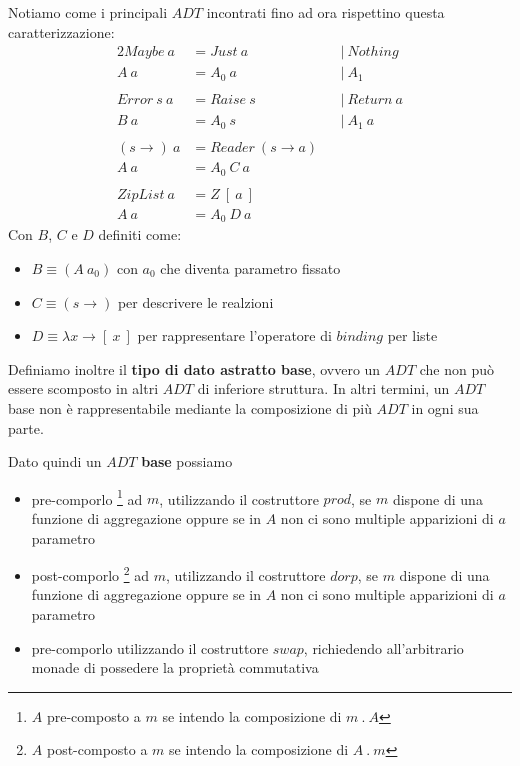 Notiamo come i principali $ADT$ incontrati fino ad ora rispettino questa caratterizzazione:
\begin{alignat*}{2}
  Maybe\ a &= Just\ a\ &&|\ Nothing\\
  A\ a &= A_0\ a\ &&|\ A_1 \\\\
  Error\ s\ a &= Raise\ s\ &&|\ Return\ a\\
  B\ a &= A_0\ s\ &&|\ A_1\ a\\\\
  (s \to)\ a &= Reader\ (s \to a)\\
  A\ a &= A_0\ C\ a\\\\
  ZipList\ a &= Z\ [\ a\ ]\\
  A\ a &= A_0\ D\ a
\end{alignat*}
Con $B$, $C$ e $D$ definiti come:
\begin{itemize}
  \item $B \equiv (A\ a_0)$ con $a_0$ che diventa parametro fissato
  \item $C \equiv (s \to)$ per descrivere le realzioni
  \item $D \equiv \lambda x \to [\ x\ ]$ per rappresentare l'operatore di $binding$ per liste
\end{itemize}

Definiamo inoltre il \textbf{tipo di dato astratto base}, ovvero un $ADT$ che non può essere
scomposto in altri $ADT$ di inferiore struttura.
In altri termini, un $ADT$ base non è rappresentabile mediante la composizione di
più $ADT$ in ogni sua parte.\newline

  Dato quindi un $ADT$ \textbf{base} possiamo
  \begin{itemize}
    \item pre-comporlo \footnote{$A$ pre-composto a $m$ se intendo la composizione di $m\ .\ A$}
     ad $m$, utilizzando il costruttore $prod$, se $m$ dispone di una funzione di aggregazione
     oppure se in $A$ non ci sono multiple apparizioni di $a$ parametro
    \item post-comporlo \footnote{$A$ post-composto a $m$ se intendo la composizione di $A\ .\ m$}
     ad $m$, utilizzando il costruttore $dorp$, se $m$ dispone di una funzione di aggregazione
     oppure se in $A$ non ci sono multiple apparizioni di $a$ parametro
    \item pre-comporlo utilizzando il costruttore $swap$, richiedendo all'arbitrario
      monade di possedere la proprietà commutativa
  \end{itemize}

